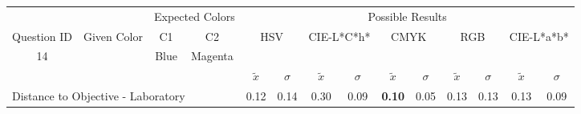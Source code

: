 \begin{table}[H]
  \resizebox{\textwidth}{!} {
  \begin{tabular}{lccccccccccccc}
    \hline
    \multicolumn{1}{c}{}                              &                                      & \multicolumn{2}{c}{Expected Colors}                   & \multicolumn{10}{c}{Possible Results}                                                                                                                                                                                                                                                                                        \\ \cline{3-14}
    \multicolumn{1}{c}{\multirow{-2}{*}{Question ID}} & \multirow{-2}{*}{Given Color}        & C1                       & C2                         & \multicolumn{2}{c}{HSV}                                        & \multicolumn{2}{c}{CIE-L*C*h*}                                 & \multicolumn{2}{c}{CMYK}                                       & \multicolumn{2}{c}{RGB}                                        & \multicolumn{2}{c}{CIE-L*a*b*}                                 \\ \hline
    \multicolumn{1}{c}{14}                             & \cellcolor[HTML]{8000FF}{\color[HTML]{FFFFFF}(27, 12, 95)} & \multicolumn{1}{c|}{Blue} & \multicolumn{1}{c|}{Magenta}  & \multicolumn{2}{c|}{\cellcolor[HTML]{8000FF}{\color[HTML]{FFFFFF}(27, 12, 95)}}      & \multicolumn{2}{c|}{\cellcolor[HTML]{B000FF}{\color[HTML]{FFFFFF}(36, 16, 96)}}       & \multicolumn{2}{c|}{\cellcolor[HTML]{8000FF}{\color[HTML]{FFFFFF}(27, 12, 95)}}       & \multicolumn{2}{c|}{\cellcolor[HTML]{8000FF}{\color[HTML]{FFFFFF}(27, 12, 95)}}       & \multicolumn{2}{c|}{\cellcolor[HTML]{AB00FF}{\color[HTML]{FFFFFF}(35, 16, 96)}}       \\ \hline
                                                      & \multicolumn{1}{l}{}                 & \multicolumn{1}{l}{}     & \multicolumn{1}{l}{}       & \multicolumn{1}{c}{$\tilde{x}$} & \multicolumn{1}{c}{$\sigma$} & \multicolumn{1}{c}{$\tilde{x}$} & \multicolumn{1}{c}{$\sigma$} & \multicolumn{1}{c}{$\tilde{x}$} & \multicolumn{1}{c}{$\sigma$} & \multicolumn{1}{c}{$\tilde{x}$} & \multicolumn{1}{c}{$\sigma$} & \multicolumn{1}{c}{$\tilde{x}$} & \multicolumn{1}{c}{$\sigma$} \\ \hline
    \multicolumn{4}{l}{Distance to Objective - Laboratory}                                                                                           & \multicolumn{1}{|c}{0.12}       & \multicolumn{1}{c|}{0.14}    & \multicolumn{1}{|c}{0.30}       & \multicolumn{1}{c|}{0.09}    & \multicolumn{1}{|c}{\textbf{0.10}}       & \multicolumn{1}{c|}{0.05}    & \multicolumn{1}{|c}{0.13}       & \multicolumn{1}{c|}{0.13}    & \multicolumn{1}{|c}{0.13}       & \multicolumn{1}{c|}{0.09}    \\

\end{tabular}}
\end{table}

